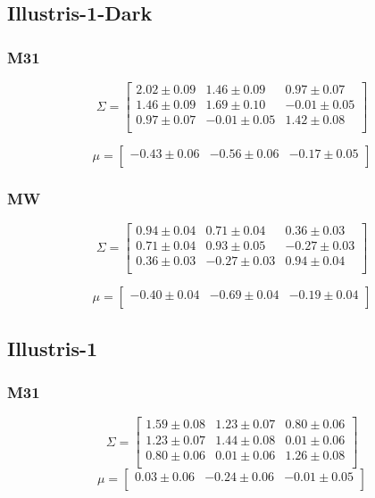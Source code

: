\documentclass[a4paper,fleqn,usenatbib]{mnras}
\begin{document}
\subsection{Illustris-1-Dark}

\subsubsection{M31}
\[
\Sigma=
\begin{bmatrix}
2.02 \pm 0.09 & 1.46 \pm 0.09 & 0.97 \pm 0.07\\
1.46 \pm 0.09 & 1.69 \pm 0.10 & -0.01 \pm 0.05\\
0.97 \pm 0.07 & -0.01 \pm 0.05 & 1.42 \pm 0.08\\
\end{bmatrix}
\]

\[
\mu=
\begin{bmatrix}
-0.43 \pm 0.06 & -0.56 \pm 0.06 & -0.17 \pm 0.05\\
\end{bmatrix}
\]

\subsubsection{MW}

\[
\Sigma=
\begin{bmatrix}
0.94 \pm 0.04 & 0.71 \pm 0.04 & 0.36 \pm 0.03\\
0.71 \pm 0.04 & 0.93 \pm 0.05 & -0.27 \pm 0.03\\
0.36 \pm 0.03 & -0.27 \pm 0.03 & 0.94 \pm 0.04\\
\end{bmatrix}
\]

\[
\mu=
\begin{bmatrix}
-0.40 \pm 0.04 & -0.69 \pm 0.04 & -0.19 \pm 0.04\\
\end{bmatrix}
\]


\subsection{Illustris-1}
\subsubsection{M31}
\[
\Sigma=
\begin{bmatrix}
1.59 \pm 0.08 & 1.23 \pm 0.07 & 0.80 \pm 0.06\\
1.23 \pm 0.07 & 1.44 \pm 0.08 & 0.01 \pm 0.06\\
0.80 \pm 0.06 & 0.01 \pm 0.06 & 1.26 \pm 0.08\\
\end{bmatrix}
\]
\[
\mu=
\begin{bmatrix}
0.03 \pm 0.06 & -0.24 \pm 0.06 & -0.01 \pm 0.05\\
\end{bmatrix}
\]
\end{document}
